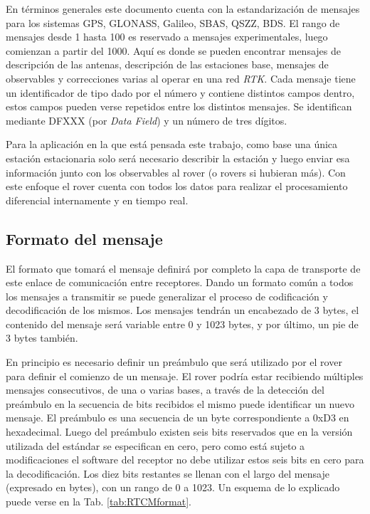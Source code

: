 \documentclass[a4paper,12pt,oneside,onecolumn,final,openright]{book}%
\begin{document}
	En términos generales este documento cuenta con la estandarización de mensajes para los sistemas GPS, GLONASS, Galileo, SBAS, QSZZ, BDS. El rango de mensajes desde 1 hasta 100 es reservado a mensajes experimentales, luego comienzan a partir del 1000. Aquí es donde se pueden encontrar mensajes de descripción de las antenas, descripción de las estaciones base, mensajes de observables y correcciones varias al operar en una red \textit{RTK}. Cada mensaje tiene un identificador de tipo dado por el número y contiene distintos campos dentro, estos campos pueden verse repetidos entre los distintos mensajes. Se identifican mediante DFXXX (por \textit{Data Field}) y un número de tres dígitos. 
	
	Para la aplicación en la que está pensada este trabajo, como base una única estación estacionaria solo será necesario describir la estación y luego enviar esa información junto con los observables al rover (o rovers si hubieran más). Con este enfoque el rover cuenta con todos los datos para realizar el procesamiento diferencial internamente y en tiempo real.
\subsection{Formato del mensaje}
	El formato que tomará el mensaje definirá por completo la capa de transporte de este enlace de comunicación entre receptores. Dando un formato común a todos los mensajes a transmitir se puede generalizar el proceso de codificación y decodificación de los mismos. Los mensajes tendrán un encabezado de 3 bytes, el contenido del mensaje será variable entre 0 y 1023 bytes, y por último, un pie de 3 bytes también.
	
	En principio es necesario definir un preámbulo que será utilizado por el rover para definir el comienzo de un mensaje. El rover podría estar recibiendo múltiples mensajes consecutivos, de una o varias bases, a través de la detección del preámbulo en la secuencia de bits recibidos el mismo puede identificar un nuevo mensaje. El preámbulo es una secuencia de un byte correspondiente a 0xD3 en hexadecimal. Luego del preámbulo existen seis bits reservados que en la versión utilizada del estándar se especifican en cero, pero como está sujeto a modificaciones el software del receptor no debe utilizar estos seis bits en cero para la decodificación. Los diez bits restantes se llenan con el largo del mensaje (expresado en bytes), con un rango de 0 a 1023. Un esquema de lo explicado puede verse en la Tab. \ref{tab:RTCMformat}.
	
\end{document}
